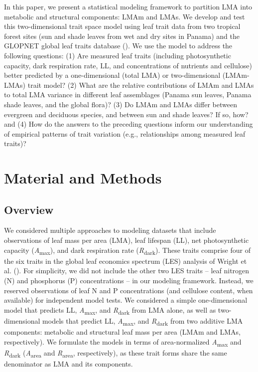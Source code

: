 \documentclass[
  12pt,
  letterpaper,
  DIV=11,
  numbers=noendperiod]{scrartcl}
\begin{document}
In this paper, we present a statistical modeling framework to partition
LMA into metabolic and structural components: LMAm and LMAs. We develop
and test this two-dimensional trait space model using leaf trait data
from two tropical forest sites (sun and shade leaves from wet and dry
sites in Panama) and the GLOPNET global leaf traits database
(). We use the model to
address the following questions: (1) Are measured leaf traits (including
photosynthetic capacity, dark respiration rate, LL, and concentrations
of nutrients and cellulose) better predicted by a one-dimensional (total
LMA) or two-dimensional (LMAm-LMAs) trait model? (2) What are the
relative contributions of LMAm and LMAs to total LMA variance in
different leaf assemblages (Panama sun leaves, Panama shade leaves, and
the global flora)? (3) Do LMAm and LMAs differ between evergreen and
deciduous species, and between sun and shade leaves? If so, how? and (4)
How do the answers to the preceding questions inform our understanding
of empirical patterns of trait variation (e.g., relationships among
measured leaf traits)?

\section{Material and Methods}\label{material-and-methods}

\subsection{Overview}\label{overview}

We considered multiple approaches to modeling datasets that include
observations of leaf mass per area (LMA), leaf lifespan (LL), net
photosynthetic capacity (\emph{A}\textsubscript{max}), and dark
respiration rate (\emph{R}\textsubscript{dark}). These traits comprise
four of the six traits in the global leaf economics spectrum (LES)
analysis of Wright et al. (). For
simplicity, we did not include the other two LES traits -- leaf nitrogen
(N) and phosphorus (P) concentrations -- in our modeling framework.
Instead, we reserved observations of leaf N and P concentrations (and
cellulose content, when available) for independent model tests. We
considered a simple one-dimensional model that predicts LL,
\emph{A}\textsubscript{max}, and \emph{R}\textsubscript{dark} from LMA
alone, as well as two-dimensional models that predict LL,
\emph{A}\textsubscript{max}, and \emph{R}\textsubscript{dark} from two
additive LMA components: metabolic and structural leaf mass per area
(LMAm and LMAs, respectively). We formulate the models in terms of
area-normalized \emph{A}\textsubscript{max} and
\emph{R}\textsubscript{dark} (\emph{A}\textsubscript{area} and
\emph{R}\textsubscript{area}, respectively), as these trait forms share
the same denominator as LMA and its components.
\end{document}
